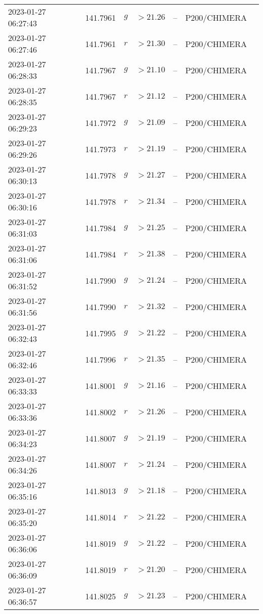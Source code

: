 \documentclass{nature_plusfigure}
\begin{document}
\begin{supplement}
\begin{center}
\begin{longtable}{lllllll}
2023-01-27 06:27:43 & 141.7961 & $g$ & $>21.26$ & -- & P200/CHIMERA &  \\ 
2023-01-27 06:27:46 & 141.7961 & $r$ & $>21.30$ & -- & P200/CHIMERA &  \\ 
2023-01-27 06:28:33 & 141.7967 & $g$ & $>21.10$ & -- & P200/CHIMERA &  \\ 
2023-01-27 06:28:35 & 141.7967 & $r$ & $>21.12$ & -- & P200/CHIMERA &  \\ 
2023-01-27 06:29:23 & 141.7972 & $g$ & $>21.09$ & -- & P200/CHIMERA &  \\ 
2023-01-27 06:29:26 & 141.7973 & $r$ & $>21.19$ & -- & P200/CHIMERA &  \\ 
2023-01-27 06:30:13 & 141.7978 & $g$ & $>21.27$ & -- & P200/CHIMERA &  \\ 
2023-01-27 06:30:16 & 141.7978 & $r$ & $>21.34$ & -- & P200/CHIMERA &  \\ 
2023-01-27 06:31:03 & 141.7984 & $g$ & $>21.25$ & -- & P200/CHIMERA &  \\ 
2023-01-27 06:31:06 & 141.7984 & $r$ & $>21.38$ & -- & P200/CHIMERA &  \\ 
2023-01-27 06:31:52 & 141.7990 & $g$ & $>21.24$ & -- & P200/CHIMERA &  \\ 
2023-01-27 06:31:56 & 141.7990 & $r$ & $>21.32$ & -- & P200/CHIMERA &  \\ 
2023-01-27 06:32:43 & 141.7995 & $g$ & $>21.22$ & -- & P200/CHIMERA &  \\ 
2023-01-27 06:32:46 & 141.7996 & $r$ & $>21.35$ & -- & P200/CHIMERA &  \\ 
2023-01-27 06:33:33 & 141.8001 & $g$ & $>21.16$ & -- & P200/CHIMERA &  \\ 
2023-01-27 06:33:36 & 141.8002 & $r$ & $>21.26$ & -- & P200/CHIMERA &  \\ 
2023-01-27 06:34:23 & 141.8007 & $g$ & $>21.19$ & -- & P200/CHIMERA &  \\ 
2023-01-27 06:34:26 & 141.8007 & $r$ & $>21.24$ & -- & P200/CHIMERA &  \\ 
2023-01-27 06:35:16 & 141.8013 & $g$ & $>21.18$ & -- & P200/CHIMERA &  \\ 
2023-01-27 06:35:20 & 141.8014 & $r$ & $>21.22$ & -- & P200/CHIMERA &  \\ 
2023-01-27 06:36:06 & 141.8019 & $g$ & $>21.22$ & -- & P200/CHIMERA &  \\ 
2023-01-27 06:36:09 & 141.8019 & $r$ & $>21.20$ & -- & P200/CHIMERA &  \\ 
2023-01-27 06:36:57 & 141.8025 & $g$ & $>21.23$ & -- & P200/CHIMERA &  \\ 

\end{longtable}
\end{center}
\end{supplement}
\end{document}
